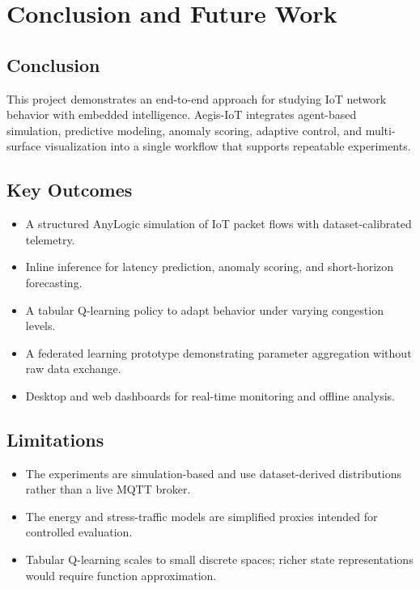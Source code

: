 \chapter{Conclusion and Future Work}

\section{Conclusion}

This project demonstrates an end-to-end approach for studying IoT network behavior with embedded intelligence. Aegis-IoT integrates agent-based simulation, predictive modeling, anomaly scoring, adaptive control, and multi-surface visualization into a single workflow that supports repeatable experiments.

\section{Key Outcomes}

\begin{itemize}
    \item A structured AnyLogic simulation of IoT packet flows with dataset-calibrated telemetry.
    \item Inline inference for latency prediction, anomaly scoring, and short-horizon forecasting.
    \item A tabular Q-learning policy to adapt behavior under varying congestion levels.
    \item A federated learning prototype demonstrating parameter aggregation without raw data exchange.
    \item Desktop and web dashboards for real-time monitoring and offline analysis.
\end{itemize}

\section{Limitations}

\begin{itemize}
    \item The experiments are simulation-based and use dataset-derived distributions rather than a live MQTT broker.
    \item The energy and stress-traffic models are simplified proxies intended for controlled evaluation.
    \item Tabular Q-learning scales to small discrete spaces; richer state representations would require function approximation.
\end{itemize}

